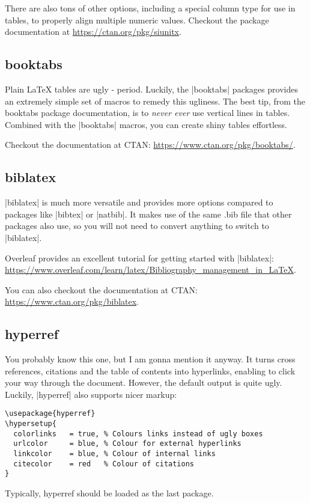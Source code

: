 
There are also tons of other options, including a special column type for use in tables, to properly align multiple numeric values. Checkout the package documentation at \url{https://ctan.org/pkg/siunitx}.

\subsection{booktabs}
Plain \LaTeX{} tables are ugly - period. Luckily, the |booktabs| packages provides an extremely simple set of macros to remedy this ugliness. The best tip, from the booktabs package documentation, is to \emph{never ever} use vertical lines in tables. Combined with the |booktabs| macros, you can create shiny tables effortless.


Checkout the documentation at CTAN: \url{https://www.ctan.org/pkg/booktabs/}.

\subsection{biblatex}
|biblatex| is much more versatile and provides more options compared to packages like |bibtex| or |natbib|. It makes use of the same .bib file that other packages also use, so you will not need to convert anything to switch to |biblatex|.

Overleaf provides an excellent tutorial for getting started with |biblatex|: \url{https://www.overleaf.com/learn/latex/Bibliography_management_in_LaTeX}.

You can also checkout the documentation at CTAN: \url{https://www.ctan.org/pkg/biblatex}.

\subsection{hyperref}
You probably know this one, but I am gonna mention it anyway. It turns cross references, citations and the table of contents into hyperlinks, enabling to click your way through the document. However, the default output is quite ugly. Luckily, |hyperref| also supports nicer markup:
\begin{lstlisting}
\usepackage{hyperref}
\hypersetup{
  colorlinks   = true, % Colours links instead of ugly boxes
  urlcolor     = blue, % Colour for external hyperlinks
  linkcolor    = blue, % Colour of internal links
  citecolor    = red   % Colour of citations
}
\end{lstlisting}
Typically, hyperref should be loaded as the last package.

